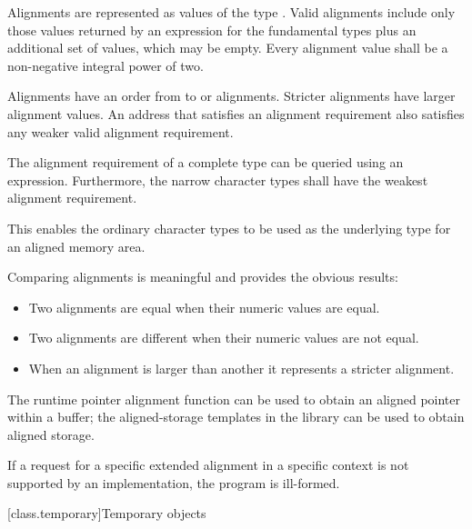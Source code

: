 \pnum
Alignments are represented as values of the type .
Valid alignments include only those values returned by an 
expression for the fundamental types plus an additional 
set of values, which may be empty.
Every alignment value shall be a non-negative integral power of two.

\pnum
Alignments have an order from  to
 or  alignments. Stricter
alignments have larger alignment values. An address that satisfies an alignment
requirement also satisfies any weaker valid alignment requirement.

\pnum
The alignment requirement of a complete type can be queried using an
 expression. Furthermore,
the narrow character types shall have the weakest
alignment requirement.
\begin{note} This enables the ordinary character types to be used as the
underlying type for an aligned memory area.\end{note}

\pnum
Comparing alignments is meaningful and provides the obvious results:

\begin{itemize}
\item Two alignments are equal when their numeric values are equal.
\item Two alignments are different when their numeric values are not equal.
\item When an alignment is larger than another it represents a stricter alignment.
\end{itemize}

\pnum
\begin{note} The runtime pointer alignment function
can be used to obtain an aligned pointer within a buffer; the aligned-storage templates
in the library can be used to obtain aligned storage.
\end{note}

\pnum
If a request for a specific extended alignment in a specific context is not
supported by an implementation, the program is ill-formed.

[class.temporary]{Temporary objects}

